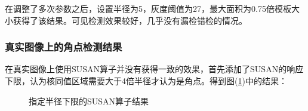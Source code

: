 \documentclass[a4paper,11pt,UTF8]{ctexart}
\begin{document}
在调整了多次参数之后，设置半径为5，灰度阈值为27，最大面积为0.75倍模板大小获得了该结果。可见检测效果较好，几乎没有漏检错检的情况。

\subsubsection{真实图像上的角点检测结果}
在真实图像上使用SUSAN算子并没有获得一致的效果，首先添加了SUSAN的响应下限，认为核同值区域需要大于4倍半径才认为是角点。得到图(\ref{susan_obj_1})中的结果：
\begin{figure}[htbp]
    \centering  %
    

    \caption{指定半径下限的SUSAN算子结果}    %
    \label{susan_obj_1}    %
\end{figure}
\end{document}
